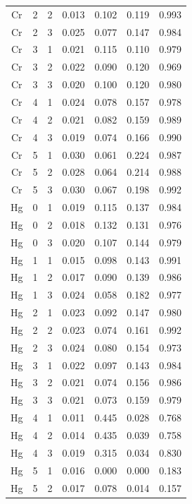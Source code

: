 \documentclass[ms, hidelinks]{uncgdissertationexp}
\theoremstyle{plain}
\theoremstyle{definition}
\theoremstyle{remark}
\begin{document}
\begin{longtable}{ccccccc}
Cr & 2 & 2 & 0.013 & 0.102 & 0.119 & 0.993\\
\rowcolor{gray!6}  Cr & 2 & 3 & 0.025 & 0.077 & 0.147 & 0.984\\
Cr & 3 & 1 & 0.021 & 0.115 & 0.110 & 0.979\\
\rowcolor{gray!6}  Cr & 3 & 2 & 0.022 & 0.090 & 0.120 & 0.969\\
Cr & 3 & 3 & 0.020 & 0.100 & 0.120 & 0.980\\
\rowcolor{gray!6}  Cr & 4 & 1 & 0.024 & 0.078 & 0.157 & 0.978\\
Cr & 4 & 2 & 0.021 & 0.082 & 0.159 & 0.989\\
\rowcolor{gray!6}  Cr & 4 & 3 & 0.019 & 0.074 & 0.166 & 0.990\\
Cr & 5 & 1 & 0.030 & 0.061 & 0.224 & 0.987\\
\rowcolor{gray!6}  Cr & 5 & 2 & 0.028 & 0.064 & 0.214 & 0.988\\
Cr & 5 & 3 & 0.030 & 0.067 & 0.198 & 0.992\\
\rowcolor{gray!6}  Hg & 0 & 1 & 0.019 & 0.115 & 0.137 & 0.984\\
Hg & 0 & 2 & 0.018 & 0.132 & 0.131 & 0.976\\
\rowcolor{gray!6}  Hg & 0 & 3 & 0.020 & 0.107 & 0.144 & 0.979\\
Hg & 1 & 1 & 0.015 & 0.098 & 0.143 & 0.991\\
\rowcolor{gray!6}  Hg & 1 & 2 & 0.017 & 0.090 & 0.139 & 0.986\\
Hg & 1 & 3 & 0.024 & 0.058 & 0.182 & 0.977\\
\rowcolor{gray!6}  Hg & 2 & 1 & 0.023 & 0.092 & 0.147 & 0.980\\
Hg & 2 & 2 & 0.023 & 0.074 & 0.161 & 0.992\\
\rowcolor{gray!6}  Hg & 2 & 3 & 0.024 & 0.080 & 0.154 & 0.973\\
Hg & 3 & 1 & 0.022 & 0.097 & 0.143 & 0.984\\
\rowcolor{gray!6}  Hg & 3 & 2 & 0.021 & 0.074 & 0.156 & 0.986\\
Hg & 3 & 3 & 0.021 & 0.073 & 0.159 & 0.979\\
\rowcolor{gray!6}  Hg & 4 & 1 & 0.011 & 0.445 & 0.028 & 0.768\\
Hg & 4 & 2 & 0.014 & 0.435 & 0.039 & 0.758\\
\rowcolor{gray!6}  Hg & 4 & 3 & 0.019 & 0.315 & 0.034 & 0.830\\
Hg & 5 & 1 & 0.016 & 0.000 & 0.000 & 0.183\\
\rowcolor{gray!6}  Hg & 5 & 2 & 0.017 & 0.078 & 0.014 & 0.157\\

\end{longtable}
\end{document}
